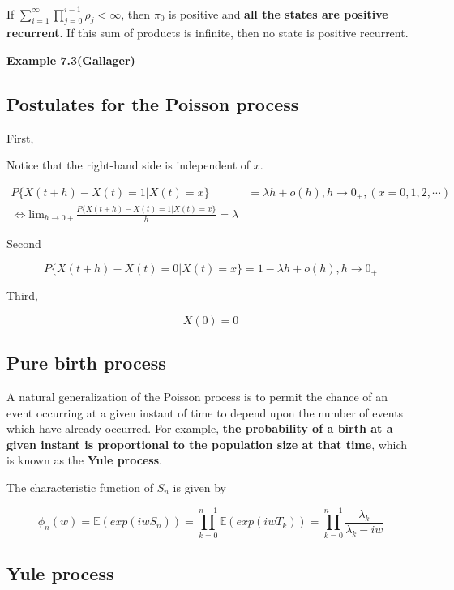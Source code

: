 \documentclass[12pt]{article}
\theoremstyle{nonumberbreak}
\begin{document}
If $\sum_{i=1}^\infty \prod_{j=0}^{i-1} \rho_j < \infty$, then $\pi_0$ is positive and \textbf{all the states are positive recurrent}. If this sum of products is infinite, then no state is positive recurrent. 


\textbf{Example 7.3(Gallager)}




\subsection{Postulates for the Poisson process}


First, 

Notice that the right-hand side is independent of $x$. 

$$
\begin{aligned}
P\{ X(t+h) - X(t) = 1 | X(t) = x \} &= \lambda h + o(h), h \to 0_+, (x=0,1,2,\cdots) \\[10pt]
\Leftrightarrow \mathrm{lim}_{h \to 0+} \frac{P\{ X(t+h) - X(t) = 1 | X(t) = x \}}{h} = \lambda
\end{aligned}
$$



Second


$$
P\{ X(t+h) - X(t) = 0 | X(t) = x \} = 1 - \lambda h + o(h), h \to 0_+
$$


Third,

$$
X(0) = 0 
$$


\subsection{Pure birth process}

A natural generalization of the Poisson process is to permit the chance of an event occurring at a given instant of time to depend upon the number of events which have already occurred. For example, \textbf{the probability of a birth at a given instant is proportional to the population size at that time}, which is known as the \textbf{Yule process}.




The characteristic function of $S_n$ is given by

$$
\phi_n(w) = \mathbb{E}(exp(iwS_n)) = \prod_{k=0}^{n-1} \mathbb{E}(exp(iw T_k)) = \prod_{k=0}^{n-1} \frac{\lambda_k}{\lambda_k - iw}
$$


\subsection{Yule process}
\end{document}
